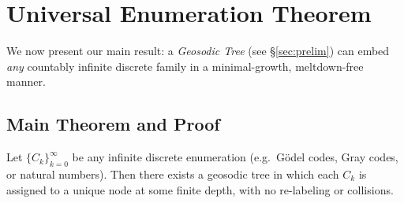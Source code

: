 \section{Universal Enumeration Theorem}
\label{sec:enumeration}

We now present our main result: a \emph{Geosodic Tree} (see \S\ref{sec:prelim})
can embed \emph{any} countably infinite discrete family in a minimal-growth, meltdown-free manner.

\subsection{Main Theorem and Proof}

\begin{theorem}
\label{thm:univenum}
Let $\{C_k\}_{k=0}^\infty$ be any infinite discrete enumeration (e.g.\ G\"odel codes, Gray codes, 
or natural numbers). Then there exists a geosodic tree in which each $C_k$ is assigned to a unique node 
at some finite depth, with no re-labeling or collisions.
\end{theorem}

